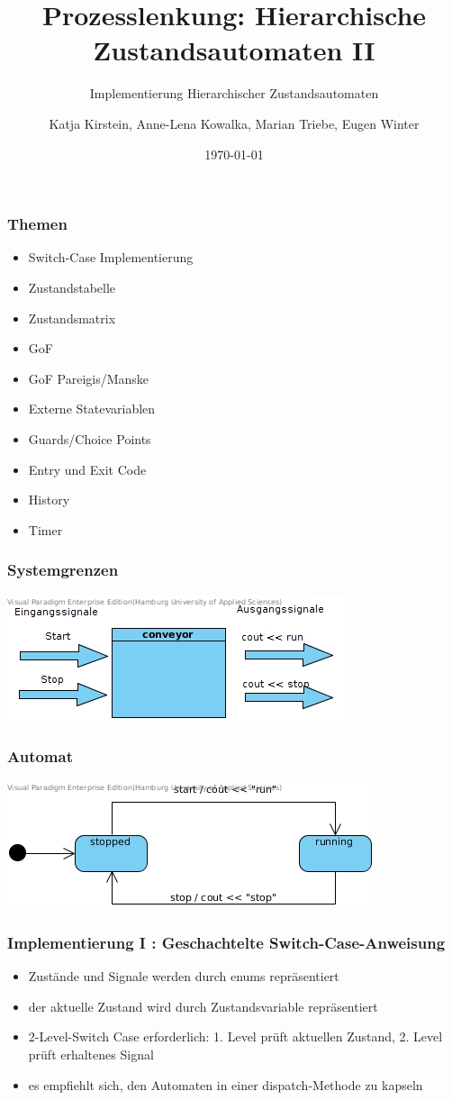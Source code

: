 \documentclass{beamer}
\title{Prozesslenkung: Hierarchische Zustandsautomaten II}
\subtitle{Implementierung Hierarchischer Zustandsautomaten}
\author{Katja Kirstein, Anne-Lena Kowalka, Marian Triebe, Eugen Winter}
\date{\today}
\begin{document}
\begin{frame}
 \titlepage
\end{frame}

\begin{frame}
 \frametitle{Themen}
 \begin{itemize}
  \item Switch-Case Implementierung
  \item Zustandstabelle
  \item Zustandsmatrix
  \item GoF
  \item GoF Pareigis/Manske
  \item Externe Statevariablen
  \item Guards/Choice Points
  \item Entry und Exit Code
  \item History
  \item Timer
 \end{itemize}
\end{frame}

\begin{frame}
 \frametitle{Systemgrenzen}
 \includegraphics[scale=.7]{img/Systemgrenzen_fsm_gof.jpg}
\end{frame}

\begin{frame}
 \frametitle{Automat}
 \includegraphics[scale=.8]{img/fsm_gof_automat.jpg}
\end{frame}

\begin{frame}
  \frametitle{Implementierung I : Geschachtelte Switch-Case-Anweisung}
  \begin{itemize}
    \item Zust\"ande und Signale werden durch enums repr\"asentiert
    \item der aktuelle Zustand wird durch Zustandsvariable repr\"asentiert
    \item 2-Level-Switch Case erforderlich: 1. Level pr\"uft aktuellen Zustand,
    2. Level pr\"uft erhaltenes Signal
    \item es empfiehlt sich, den Automaten in einer dispatch-Methode zu kapseln
  \end{itemize}
\end{frame}
\end{document}
